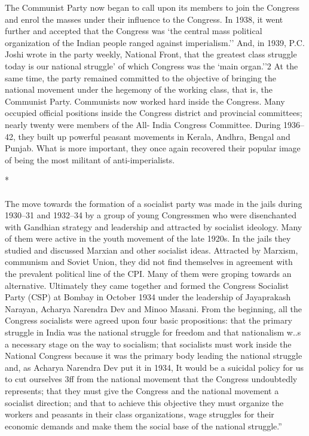 \begin{multicols}{2}
The Communist Party now began to call upon its members to join the Congress and enrol the masses under their influence to the Congress. In 1938, it went further and accepted that the Congress was `the central mass political organization of the Indian people ranged against imperialism.'' And, in 1939, P.C. Joshi wrote in the party weekly, National Front, that the greatest class struggle today is our national struggle' of which Congress was the `main organ.''2 At the same time, the party remained committed to the objective of bringing the national movement under the hegemony of the working class, that is, the Communist Party. Communists now worked hard inside the Congress. Many occupied official positions inside the Congress district and provincial committees; nearly twenty were members of the All- India Congress Committee. During 1936--42, they built up powerful peasant movements in Kerala, Andhra, Bengal and Punjab. What is more important, they once again recovered their popular image of being the most militant of anti-imperialists.

\begin{center}*\end{center}

\paragraph*{}

The move towards the formation of a socialist party was made in the jails during 1930--31 and 1932--34 by a group of young Congressmen who were disenchanted with Gandhian strategy and leadership and attracted by socialist ideology. Many of them were active in the youth movement of the late 1920s. In the jails they studied and discussed Marxian and other socialist ideas. Attracted by Marxism, communism and Soviet Union, they did not find themselves in agreement with the prevalent political line of the CPI. Many of them were groping towards an alternative. Ultimately they came together and formed the Congress Socialist Party (CSP) at Bombay in October 1934 under the leadership of Jayaprakash Narayan, Acharya Narendra Dev and Minoo Masani. From the beginning, all the Congress socialists were agreed upon four basic propositions: that the primary struggle in India was the national struggle for freedom and that nationalism w..s a necessary stage on the way to socialism; that socialists must work inside the National Congress because it was the primary body leading the national struggle and, as Acharya Narendra Dev put it in 1934, It would be a suicidal policy for us to cut ourselves 3ff from the national movement that the Congress undoubtedly represents; that they must give the Congress and the national movement a socialist direction; and that to achieve this objective they must organize the workers and peasants in their class organizations, wage struggles for their economic demands and make them the social base of the national struggle.'' 


\end{multicols}
